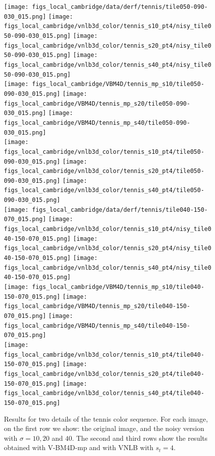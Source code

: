 \documentclass[10pt, journal, twocolumn, final, a4paper]{IEEEtran}
\begin{document}
\begin{figure}[htpb!]
	\centering
	\texttt{[image: figs\_local\_cambridge/data/derf/tennis/tile050-090-030\_015.png]}%
	\texttt{[image: figs\_local\_cambridge/vnlb3d\_color/tennis\_s10\_pt4/nisy\_tile050-090-030\_015.png]}%
	\texttt{[image: figs\_local\_cambridge/vnlb3d\_color/tennis\_s20\_pt4/nisy\_tile050-090-030\_015.png]}%
	\texttt{[image: figs\_local\_cambridge/vnlb3d\_color/tennis\_s40\_pt4/nisy\_tile050-090-030\_015.png]}\\
	\hspace               {0.2\textwidth}%
	\texttt{[image: figs\_local\_cambridge/VBM4D/tennis\_mp\_s10/tile050-090-030\_015.png]}%
	\texttt{[image: figs\_local\_cambridge/VBM4D/tennis\_mp\_s20/tile050-090-030\_015.png]}%
	\texttt{[image: figs\_local\_cambridge/VBM4D/tennis\_mp\_s40/tile050-090-030\_015.png]}\\
	\hspace               {0.2\textwidth}%
	\texttt{[image: figs\_local\_cambridge/vnlb3d\_color/tennis\_s10\_pt4/tile050-090-030\_015.png]}%
	\texttt{[image: figs\_local\_cambridge/vnlb3d\_color/tennis\_s20\_pt4/tile050-090-030\_015.png]}%
	\texttt{[image: figs\_local\_cambridge/vnlb3d\_color/tennis\_s40\_pt4/tile050-090-030\_015.png]}\\

	\vspace{.1cm}
	\texttt{[image: figs\_local\_cambridge/data/derf/tennis/tile040-150-070\_015.png]}%
	\texttt{[image: figs\_local\_cambridge/vnlb3d\_color/tennis\_s10\_pt4/nisy\_tile040-150-070\_015.png]}%
	\texttt{[image: figs\_local\_cambridge/vnlb3d\_color/tennis\_s20\_pt4/nisy\_tile040-150-070\_015.png]}%
	\texttt{[image: figs\_local\_cambridge/vnlb3d\_color/tennis\_s40\_pt4/nisy\_tile040-150-070\_015.png]}\\
	\hspace               {0.2\textwidth}%
	\texttt{[image: figs\_local\_cambridge/VBM4D/tennis\_mp\_s10/tile040-150-070\_015.png]}%
	\texttt{[image: figs\_local\_cambridge/VBM4D/tennis\_mp\_s20/tile040-150-070\_015.png]}%
	\texttt{[image: figs\_local\_cambridge/VBM4D/tennis\_mp\_s40/tile040-150-070\_015.png]}\\
	\hspace               {0.2\textwidth}%
	\texttt{[image: figs\_local\_cambridge/vnlb3d\_color/tennis\_s10\_pt4/tile040-150-070\_015.png]}%
	\texttt{[image: figs\_local\_cambridge/vnlb3d\_color/tennis\_s20\_pt4/tile040-150-070\_015.png]}%
	\texttt{[image: figs\_local\_cambridge/vnlb3d\_color/tennis\_s40\_pt4/tile040-150-070\_015.png]}\\
	\caption{Results for two details of the tennis color sequence. For each
	image, on the first row we show: the original image, and the noisy version
	with $\sigma = 10,20$ and $40$. The second and third rows show the results
	obtained with V-BM4D-mp and with VNLB with $s_t = 4$.}
	\label{fig:results-tennis}
\end{figure}
\end{document}
